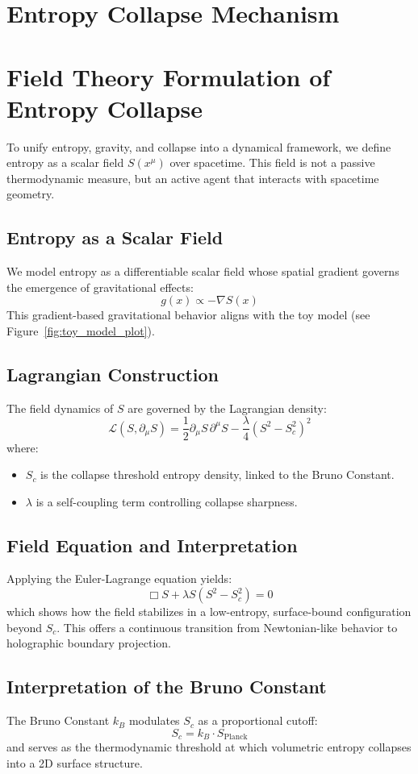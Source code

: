 \documentclass[12pt]{article}
\begin{document}
\section{Entropy Collapse Mechanism}
\clearpage
\section{Field Theory Formulation of Entropy Collapse}

To unify entropy, gravity, and collapse into a dynamical framework, we define entropy as a scalar field $S(x^\mu)$ over spacetime. This field is not a passive thermodynamic measure, but an active agent that interacts with spacetime geometry. 

\subsection*{Entropy as a Scalar Field}
We model entropy as a differentiable scalar field whose spatial gradient governs the emergence of gravitational effects:
\[
g(x) \propto -\nabla S(x)
\]
This gradient-based gravitational behavior aligns with the toy model (see Figure~\ref{fig:toy_model_plot}).

\subsection*{Lagrangian Construction}
The field dynamics of $S$ are governed by the Lagrangian density:
\[
\mathcal{L}(S, \partial_\mu S) = \frac{1}{2} \partial_\mu S \, \partial^\mu S - \frac{\lambda}{4}(S^2 - S_c^2)^2
\]
where:
\begin{itemize}
\item $S_c$ is the collapse threshold entropy density, linked to the Bruno Constant.
\item $\lambda$ is a self-coupling term controlling collapse sharpness.
\end{itemize}

\subsection*{Field Equation and Interpretation}
Applying the Euler-Lagrange equation yields:
\[
\Box S + \lambda S(S^2 - S_c^2) = 0
\]
which shows how the field stabilizes in a low-entropy, surface-bound configuration beyond $S_c$. This offers a continuous transition from Newtonian-like behavior to holographic boundary projection.

\subsection*{Interpretation of the Bruno Constant}
The Bruno Constant $k_B$ modulates $S_c$ as a proportional cutoff:
\[
S_c = k_B \cdot S_{\text{Planck}}
\]
and serves as the thermodynamic threshold at which volumetric entropy collapses into a 2D surface structure.
\end{document}
